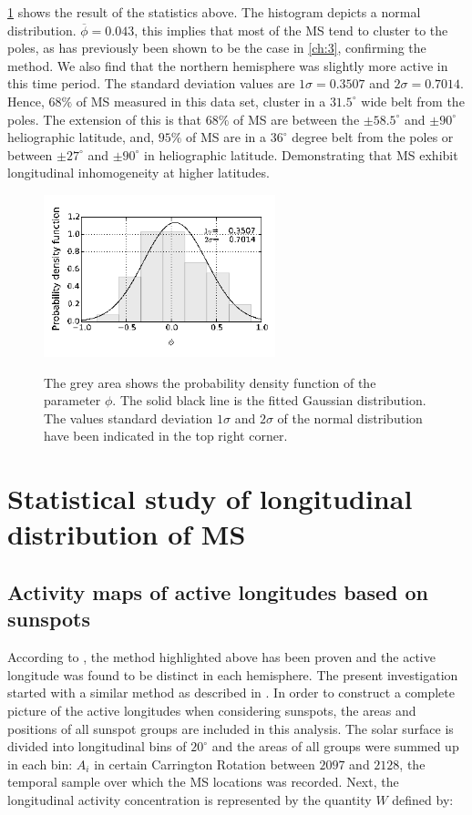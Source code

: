 \cref{ms_dis} shows the result of the statistics above. 
The histogram depicts a normal distribution. 
$\overline{\phi}=0.043$, this implies that most of the MS tend to cluster to the poles, as has previously been shown to be the case in \cref{ch:3}, confirming the method.
We also find that the northern hemisphere was slightly more active in this time period.
The standard deviation values are $1\sigma=0.3507$ and $2\sigma=0.7014$. 
Hence, $68\%$ of MS measured in this data set, cluster in a $31.5^{\circ}$ wide belt from the poles.
The extension of this is that $68\%$ of MS are between the $\pm58.5^{\circ}$ and $\pm90^{\circ}$ heliographic latitude, and, $95\%$ of MS are in a $36^{\circ}$ degree belt from the poles or between $\pm27^{\circ}$ and $\pm90^{\circ}$ in heliographic latitude.
Demonstrating that MS exhibit longitudinal inhomogeneity at higher latitudes.

\begin{figure}
	\centering
	{\includegraphics[width=0.6\textwidth]{Chapter4/Figs/MS_latitude_distribution}}
	{\caption{The grey area shows the probability density function of the parameter $\phi$. The solid black line is the fitted Gaussian distribution. The values standard deviation $1\sigma$ and $2\sigma$ of the normal distribution have been indicated in the top right corner.}\label{ms_dis}}
\end{figure}

\section{Statistical study of longitudinal distribution of MS}
\subsection{Activity maps of active longitudes based on sunspots}

According to \cite{Gyenge2014}, the method highlighted above has been proven and the active longitude was found to be distinct in each hemisphere.
The present investigation started with a similar method as described in \cite{Gyenge2012}. 
In order to construct a complete picture of the active longitudes when considering sunspots, the areas and positions of all sunspot groups are included in this analysis.
The solar surface is divided into longitudinal bins of $20^{\circ}$ and the areas of all groups were summed up in each bin: $ A_{i}$ in certain Carrington Rotation between $2097$ and $2128$, the temporal sample over which the MS locations was recorded.
Next, the longitudinal activity concentration is represented by the quantity $W$ defined by:


